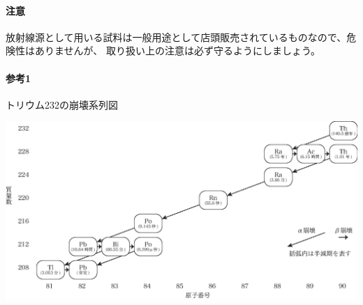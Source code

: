 \paragraph{注意}
放射線源として用いる試料は一般用途として店頭販売されているものなので、危険性はありませんが、
取り扱い上の注意は必ず守るようにしましょう。

\newpage

\paragraph{参考1}
トリウム232の崩壊系列図
\begin{center}
\includegraphics[width=155mm]{14_Radiation/Thorium.eps}
\end{center}


